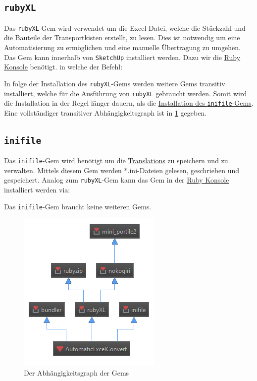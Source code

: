 \documentclass{book}
\newcommand{\sketchup}{\texttt{SketchUp}\xspace}
\newcommand{\rubyXL}{\texttt{rubyXL}\xspace}
\newcommand{\inifile}{\texttt{inifile}\xspace}
\begin{document}
			\subsection{\rubyXL} \label{rubyXL}
				Das \rubyXL-Gem wird verwendet um die Excel-Datei, welche die Stückzahl und die Bauteile der Transportkisten erstellt, zu lesen. Dies ist notwendig um eine Automatisierung zu ermöglichen und eine manuelle Übertragung zu umgehen.\\
				Das Gem kann innerhalb von \sketchup installiert werden. Dazu wir die \hyperref[Ruby Konsole]{Ruby Konsole} benötigt. in welche der Befehl:
				
				In folge der Installation des \rubyXL-Gems werden weitere Gems transitiv installiert, welche für die Ausführung von \rubyXL gebraucht werden. Somit wird die Installation in der Regel länger dauern, als die \hyperref[inifile]{Installation des \inifile-Gems}.\\
				Eine vollständiger transitiver Abhängigkeitsgraph ist in \ref{Abhaengigkeitsgraph} gegeben.
			\subsection{\inifile} \label{inifile}
				Das \inifile-Gem wird benötigt um die \hyperref[Translations]{Translations} zu speichern und zu verwalten. Mittels diesem Gem werden *.ini-Dateien gelesen, geschrieben und gespeichert. Analog zum \rubyXL-Gem kann das Gem in der \hyperref[Ruby Konsole]{Ruby Konsole} installiert werden via:
				
				Das \inifile-Gem braucht keine weiteren Gems.
			\begin{figure}
				\centering
				\includegraphics[scale=0.6]{pics/Gemdependency-full.png}
				\caption{Der Abhängigkeitsgraph der Gems}
				\label{Abhaengigkeitsgraph}
			\end{figure}
\end{document}
